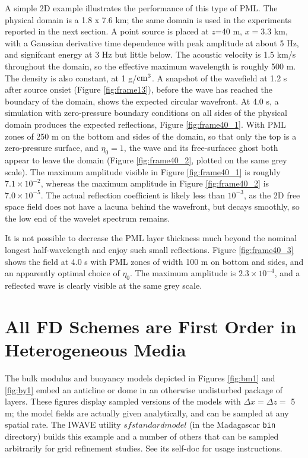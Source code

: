 A simple 2D example illustrates the performance of this type of
PML. The physical 
domain is a 1.8 x 7.6 km; the same domain is used in the experiments
reported in the next section. A point source is placed at $z$=40 m,
$x=3.3$ km, with a Gaussian derivative time dependence with peak
amplitude at about 5 Hz, and signifcant energy at 3 Hz but little below. The acoustic velocity is 1.5 km/s throughout
the domain, so the effective maximum wavelength is roughly 500 m. The
density is also constant, at 1 g/${\rm cm}^3$. A
snapshot of the wavefield at 1.2 s after source onsiet
(Figure \ref{fig:frame13}), before the wave has reached the boundary of the
domain, shows the expected circular wavefront. At 4.0 s, a simulation
with zero-pressure boundary conditions on all sides of the physical
domain produces the expected reflections, Figure \ref{fig:frame40_1}. With
PML zones of 250 m on the bottom and sides of the domain, so that only
the top is a zero-pressure surface, and $\eta_0=1$, the wave and its
free-surfacec ghost both appear to leave the domain
(Figure \ref{fig:frame40_2}, plotted on the same grey scale). The
maximum amplitude visible in Figure \ref{fig:frame40_1} is roughly
$7.1 \times 10^{-2}$, whereas the maximum amplitude in Figure
\ref{fig:frame40_2} is $7.0 \times 10^{-5}$. The actual reflection
coefficient is likely less than $10^{-3}$, as the 2D free space field
does not have a lacuna behind the wavefront, but decays smoothly, so
the low end of the wavelet spectrum remains.

It is not possible to decrease the PML layer thickness much beyond the
nominal longest half-wavelength and enjoy such small
reflections. Figure \ref{fig:frame40_3} shows the field at 4.0 s with
PML zones of width 100 m on bottom and sides, and an apparently
optimal choice of $\eta_0$. The maximum amplitude is $2.3 \times
10^{-4}$, and a reflected wave is clearly visible at the same grey scale.

\section{All FD Schemes are First Order in Heterogeneous Media}

The bulk modulus and buoyancy models
depicted in Figures \ref{fig:bm1} and \ref{fig:by1} embed an anticline or dome in an otherwise
undisturbed package of layers. These
figures display sampled versions of the models with $\Delta x = \Delta
z = $ 5 m; the model fields are actually given analytically, and can
be sampled at any spatial rate. The IWAVE utility $sfstandardmodel$ (in the
Madagascar {\tt bin} directory) builds this example and a number of
others that can be sampled arbitrarily for grid refinement
studies. See its self-doc for usage instructions.

